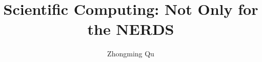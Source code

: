 

\usepackage{indentfirst}
\usepackage{subfiles} 
\usepackage{hyperref}
\usepackage{xr}
\usepackage[toc,page]{appendix}

\let\vaccent=\v %
\renewcommand{\v}[1]{\ensuremath{\mathbf{#1}}} %
\let\underdot=\d %
\renewcommand{\d}[2]{\frac{d #1}{d #2}} %
\let\baraccent=\= %
\renewcommand{\=}[1]{\stackrel{#1}{=}} %

\newcommand{\p}[0]{\ensuremath{\prime}} %
\newcommand{\pp}[0]{\ensuremath{{\prime\prime}}} %
\newcommand{\ppp}[0]{\ensuremath{{\prime\prime\prime}}} %

\title{Scientific Computing: Not Only for the NERDS}
\author{Zhongming Qu}


\maketitle
\tableofcontents
\newpage
{} 









\begin{appendices}

\end{appendices}

\begin{thebibliography}{9}

\end{thebibliography} 

 
